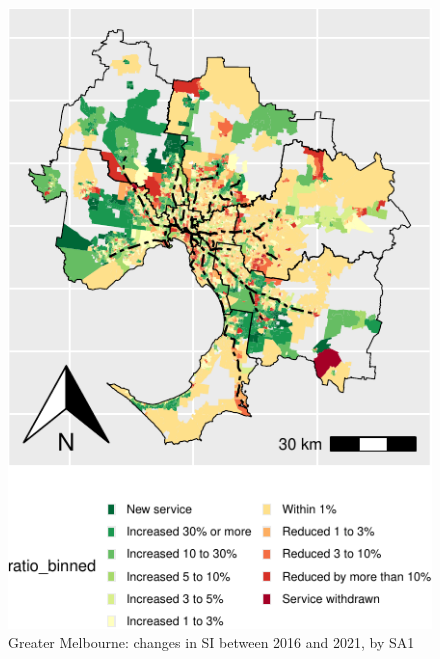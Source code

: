 \documentclass[preprint, 3p,
authoryear]{elsarticle} %
\begin{document}
\begin{figure}
\includegraphics[width=0.9\linewidth]{Leveraging_GTFS_to_assess_transit_supply_Transport_Geography_files/figure-latex/Greater_Melbourne_2016_2021_ratio_map-1} \caption{Greater Melbourne: changes in SI between 2016 and 2021, by SA1}\label{fig:Greater_Melbourne_2016_2021_ratio_map}
\end{figure}
\end{document}
